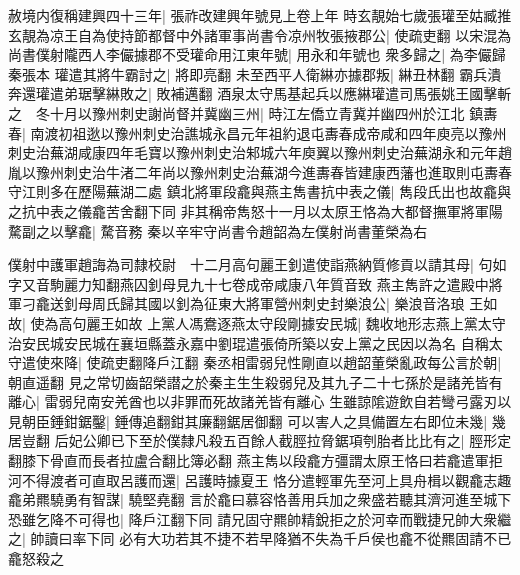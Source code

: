赦境内復稱建興四十三年|{
	張祚改建興年號見上卷上年}
時玄靚始七歲張瓘至姑臧推玄靚為凉王自為使持節都督中外諸軍事尚書令凉州牧張掖郡公|{
	使疏吏翻}
以宋混為尚書僕射隴西人李儼據郡不受瓘命用江東年號|{
	用永和年號也}
衆多歸之|{
	為李儼歸秦張本}
瓘遣其將牛霸討之|{
	將即亮翻}
未至西平人衛綝亦據郡叛|{
	綝丑林翻}
霸兵潰奔還瓘遣弟琚擊綝敗之|{
	敗補邁翻}
酒泉太守馬基起兵以應綝瓘遣司馬張姚王國擊斬之　冬十月以豫州刺史謝尚督并冀幽三州|{
	時江左僑立青冀并幽四州於江北}
鎮夀春|{
	南渡初祖逖以豫州刺史治譙城永昌元年祖約退屯夀春成帝咸和四年庾亮以豫州刺史治蕪湖咸康四年毛寶以豫州刺史治邾城六年庾翼以豫州刺史治蕪湖永和元年趙胤以豫州刺史治牛渚二年尚以豫州刺史治蕪湖今進夀春皆建康西藩也進取則屯夀春守江則多在歷陽蕪湖二處}
鎮北將軍段龕與燕主雋書抗中表之儀|{
	雋段氏出也故龕與之抗中表之儀龕苦舍翻下同}
非其稱帝雋怒十一月以太原王恪為大都督撫軍將軍陽騖副之以擊龕|{
	騖音務}
秦以辛牢守尚書令趙韶為左僕射尚書董榮為右

僕射中護軍趙誨為司隸校尉　十二月高句麗王釗遣使詣燕納質修貢以請其母|{
	句如字又音駒麗力知翻燕囚釗母見九十七卷成帝咸康八年質音致}
燕主雋許之遣殿中將軍刁龕送釗母周氏歸其國以釗為征東大將軍營州刺史封樂浪公|{
	樂浪音洛琅}
王如故|{
	使為高句麗王如故}
上黨人馮鴦逐燕太守段剛據安民城|{
	魏收地形志燕上黨太守治安民城安民城在襄垣縣蓋永嘉中劉琨遣張倚所築以安上黨之民因以為名}
自稱太守遣使來降|{
	使疏吏翻降戶江翻}
秦丞相雷弱兒性剛直以趙韶董榮亂政每公言於朝|{
	朝直遥翻}
見之常切齒韶榮譛之於秦主生生殺弱兒及其九子二十七孫於是諸羌皆有離心|{
	雷弱兒南安羌酋也以非罪而死故諸羌皆有離心}
生雖諒隂遊飲自若彎弓露刃以見朝臣錘鉗鋸鑿|{
	錘傳追翻鉗其廉翻鋸居御翻}
可以害人之具備置左右即位未幾|{
	幾居豈翻}
后妃公卿已下至於僕隸凡殺五百餘人截脛拉脅鋸項刳胎者比比有之|{
	脛形定翻膝下骨直而長者拉盧合翻比簿必翻}
燕主雋以段龕方彊謂太原王恪曰若龕遣軍拒河不得渡者可直取呂護而還|{
	呂護時據夏王}
恪分遣輕軍先至河上具舟楫以觀龕志趣龕弟羆驍勇有智謀|{
	驍堅堯翻}
言於龕曰慕容恪善用兵加之衆盛若聽其濟河進至城下恐雖乞降不可得也|{
	降戶江翻下同}
請兄固守羆帥精銳拒之於河幸而戰捷兄帥大衆繼之|{
	帥讀曰率下同}
必有大功若其不捷不若早降猶不失為千戶侯也龕不從羆固請不已龕怒殺之

